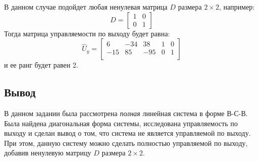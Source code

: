 В данном случае подойдет любая ненулевая матрица $D$ размера $2\times 2$, например: 
\begin{equation}
    D = \begin{bmatrix}
        1 & 0 \\
        0 & 1
    \end{bmatrix}
\end{equation}
Тогда матрица управляемости по выходу будет равна:
\begin{equation}
    \hat{U}_y = \begin{bmatrix}
        6  & -34  & 38  & 1  & 0 \\ 
        -15  & 85  & -95  & 0  & 1 \\ 
        \end{bmatrix}
\end{equation}
и ее ранг будет равен 2.

\FloatBarrier
\subsection{Вывод}
В данном задании была рассмотрена \textit{полная} линейная система 
в форме В-С-В. Была найдена диагональная форма системы, исследована управляемость
по выходу и сделан вывод о том, что система не является управляемой по выходу. 
При этом, данную систему можно сделать полностью управляемой по выходу, добавив
ненулевую матрицу $D$ размера $2\times 2$. 